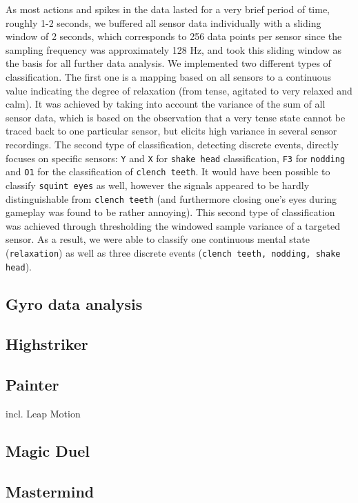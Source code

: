 \documentclass{utue} %
\begin{document}
As most actions and spikes in the data lasted for a very brief period of time, roughly 1-2 seconds, we buffered all sensor data individually with a sliding window of 2 seconds, which corresponds to 256 data points per sensor since the sampling frequency was approximately 128 Hz, and took this sliding window as the basis for all further data analysis. We implemented two different types of classification. The first one is a mapping based on all sensors to a continuous value indicating the degree of relaxation (from tense, agitated to very relaxed and calm). It was achieved by taking into account the variance of the sum of all sensor data, which is based on the observation that a very tense state cannot be traced back to one particular sensor, but elicits high variance in several sensor recordings. The second type of classification, detecting discrete events, directly focuses on specific sensors: 
\texttt{Y} and \texttt{X} for \texttt{shake head} classification, \texttt{F3} for \texttt{nodding} and \texttt{O1} for the classification of \texttt{clench teeth}. It would have been possible to classify \texttt{squint eyes} as well, however the signals appeared to be hardly distinguishable from \texttt{clench teeth} (and furthermore closing one's eyes during gameplay was found to be rather annoying). This second type of classification was achieved through thresholding the windowed sample variance of a targeted sensor. As a result, we were able to classify one continuous mental state (\texttt{relaxation}) as well as three discrete events (\texttt{clench teeth, nodding, shake head}).

\subsection{Gyro data analysis}


\subsection{Highstriker}
\subsection{Painter}
incl. Leap Motion
\subsection{Magic Duel}
\subsection{Mastermind}
\end{document}
